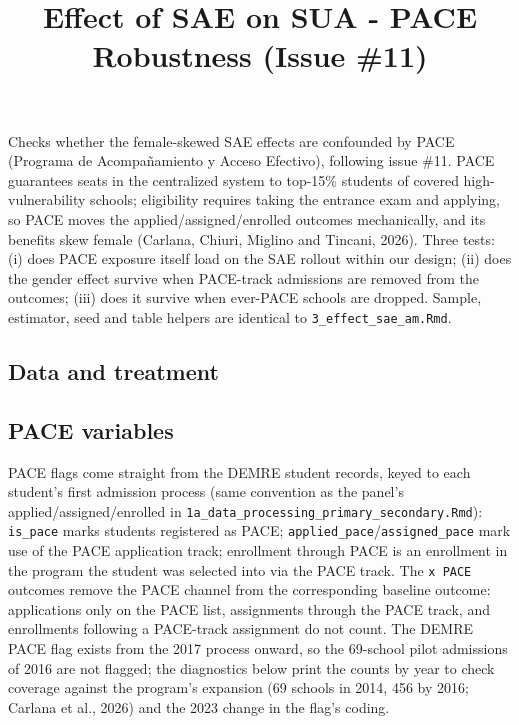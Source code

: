 \documentclass[
]{article}
\title{Effect of SAE on SUA - PACE Robustness (Issue \#11)}
\author{}
\date{\vspace{-2.5em}}
\begin{document}
\maketitle

Checks whether the female-skewed SAE effects are confounded by PACE
(Programa de Acompañamiento y Acceso Efectivo), following issue \#11.
PACE guarantees seats in the centralized system to top-15\% students of
covered high-vulnerability schools; eligibility requires taking the
entrance exam and applying, so PACE moves the applied/assigned/enrolled
outcomes mechanically, and its benefits skew female (Carlana, Chiuri,
Miglino and Tincani, 2026). Three tests: (i) does PACE exposure itself
load on the SAE rollout within our design; (ii) does the gender effect
survive when PACE-track admissions are removed from the outcomes; (iii)
does it survive when ever-PACE schools are dropped. Sample, estimator,
seed and table helpers are identical to \texttt{3\_effect\_sae\_am.Rmd}.

\hypertarget{data-and-treatment}{%
\subsection{Data and treatment}\label{data-and-treatment}}

\hypertarget{pace-variables}{%
\subsection{PACE variables}\label{pace-variables}}

PACE flags come straight from the DEMRE student records, keyed to each
student's first admission process (same convention as the panel's
applied/assigned/enrolled in
\texttt{1a\_data\_processing\_primary\_secondary.Rmd}):
\texttt{is\_pace} marks students registered as PACE;
\texttt{applied\_pace}/\texttt{assigned\_pace} mark use of the PACE
application track; enrollment through PACE is an enrollment in the
program the student was selected into via the PACE track. The
\texttt{x\ PACE} outcomes remove the PACE channel from the corresponding
baseline outcome: applications only on the PACE list, assignments
through the PACE track, and enrollments following a PACE-track
assignment do not count. The DEMRE PACE flag exists from the 2017
process onward, so the 69-school pilot admissions of 2016 are not
flagged; the diagnostics below print the counts by year to check
coverage against the program's expansion (69 schools in 2014, 456 by
2016; Carlana et al., 2026) and the 2023 change in the flag's coding.
\end{document}
